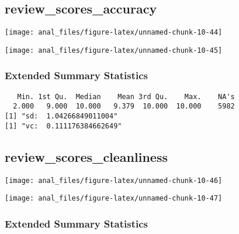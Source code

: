 \pagebreak

\centering

\hypertarget{review_scores_accuracy}{%
\subsection{review\_scores\_accuracy}\label{review_scores_accuracy}}

\begin{center}\texttt{[image: anal\_files/figure-latex/unnamed-chunk-10-44]} \end{center}

\begin{center}\texttt{[image: anal\_files/figure-latex/unnamed-chunk-10-45]} \end{center}

\hypertarget{extended-summary-statistics-15}{%
\subsubsection{Extended Summary
Statistics}\label{extended-summary-statistics-15}}

\begin{verbatim}   Min. 1st Qu.  Median    Mean 3rd Qu.    Max.    NA's 
  2.000   9.000  10.000   9.379  10.000  10.000    5982 
[1] "sd:  1.04266849011004"
[1] "vc:  0.111176384662649"
\end{verbatim}

\pagebreak

\centering

\hypertarget{review_scores_cleanliness}{%
\subsection{review\_scores\_cleanliness}\label{review_scores_cleanliness}}

\begin{center}\texttt{[image: anal\_files/figure-latex/unnamed-chunk-10-46]} \end{center}

\begin{center}\texttt{[image: anal\_files/figure-latex/unnamed-chunk-10-47]} \end{center}

\hypertarget{extended-summary-statistics-16}{%
\subsubsection{Extended Summary
Statistics}\label{extended-summary-statistics-16}}

